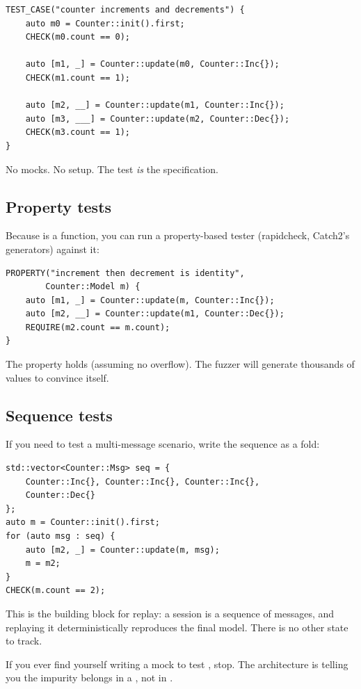 \begin{lstlisting}
TEST_CASE("counter increments and decrements") {
    auto m0 = Counter::init().first;
    CHECK(m0.count == 0);

    auto [m1, _] = Counter::update(m0, Counter::Inc{});
    CHECK(m1.count == 1);

    auto [m2, __] = Counter::update(m1, Counter::Inc{});
    auto [m3, ___] = Counter::update(m2, Counter::Dec{});
    CHECK(m3.count == 1);
}
\end{lstlisting}

No mocks. No setup. The test \emph{is} the specification.

\subsection*{Property tests}

Because  is a function, you can run a property-based
tester (rapidcheck, Catch2's generators) against it:

\begin{lstlisting}
PROPERTY("increment then decrement is identity",
        Counter::Model m) {
    auto [m1, _] = Counter::update(m, Counter::Inc{});
    auto [m2, __] = Counter::update(m1, Counter::Dec{});
    REQUIRE(m2.count == m.count);
}
\end{lstlisting}

The property holds (assuming no overflow). The fuzzer will
generate thousands of  values to convince
itself.

\subsection*{Sequence tests}

If you need to test a multi-message scenario, write the sequence
as a fold:

\begin{lstlisting}
std::vector<Counter::Msg> seq = {
    Counter::Inc{}, Counter::Inc{}, Counter::Inc{},
    Counter::Dec{}
};
auto m = Counter::init().first;
for (auto msg : seq) {
    auto [m2, _] = Counter::update(m, msg);
    m = m2;
}
CHECK(m.count == 2);
\end{lstlisting}

This is the building block for replay: a session is a sequence of
messages, and replaying it deterministically reproduces the final
model. There is no other state to track.

\begin{idea}
If you ever find yourself writing a mock to test ,
stop. The architecture is telling you the impurity belongs in a
, not in .
\end{idea}

